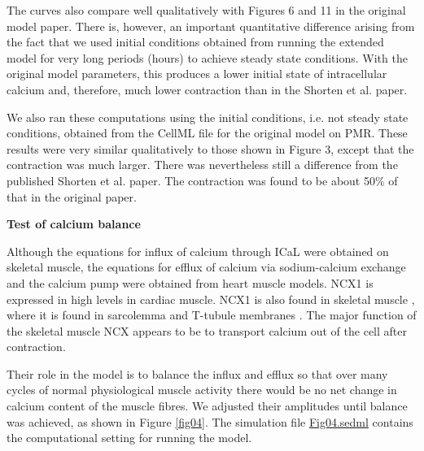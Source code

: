 \documentclass[fleqn,10pt]{physiome}
\begin{document}
The curves also compare well qualitatively with Figures 6 and 11 in the original model paper. There is, however, an important quantitative difference arising from the fact that we used initial conditions obtained from running the extended model for very long periods (hours) to achieve steady state conditions. With the original model parameters, this produces a lower initial state of intracellular calcium and, therefore, much lower contraction than in the Shorten et al. paper. 

We also ran these computations using the initial conditions, i.e. not steady state conditions, obtained from the CellML file for the original model on PMR. These results were very similar qualitatively to those shown in Figure 3, except that the contraction was much larger. There was nevertheless still a difference from the published Shorten et al. paper. The contraction was found to be about 50\% of that in the original paper.

\textbf{Test of calcium balance}\newline

Although the equations for influx of calcium through ICaL were obtained on skeletal muscle, the equations for efflux of calcium via sodium-calcium exchange and the calcium pump were obtained from heart muscle models. NCX1 is expressed in high levels in cardiac muscle. NCX1 is also found in skeletal muscle \citep{cifuentes2000sodium}, where it is found in sarcolemma and T-tubule membranes \citep{sacchetto1996colocalization}. The major function of the skeletal muscle NCX appears to be to transport calcium out of the cell after contraction.\newline

Their role in the model is to balance the influx and efflux so that over many cycles of normal physiological muscle activity there would be no net change in calcium content of the muscle fibres. We adjusted their amplitudes until balance was achieved, as shown in Figure \ref{fig04}. The simulation file \href{https://models.physiomeproject.org/workspace/5c6/file/afd4d5cb20ecdcbc0b10198fe31795520488a34e/Fig04.sedml}{Fig04.sedml} contains the computational setting for running the model.
\end{document}
